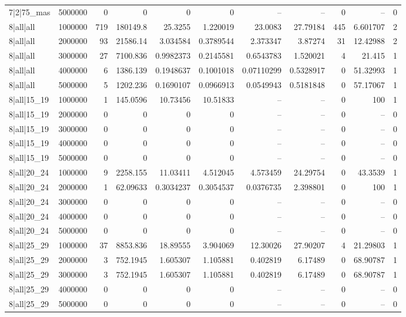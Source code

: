 \begin{tabular}{lrrrrrrrrrr}
7|2|75\_mas & 5000000 & 0 & 0 & 0 & 0 & -- & -- & 0 & -- & 0 \\
8|all|all & 1000000 & 719 & 180149.8 & 25.3255 & 1.220019 & 23.0083 & 27.79184 & 445 & 6.601707 & 2 \\
8|all|all & 2000000 & 93 & 21586.14 & 3.034584 & 0.3789544 & 2.373347 & 3.87274 & 31 & 12.42988 & 2 \\
8|all|all & 3000000 & 27 & 7100.836 & 0.9982373 & 0.2145581 & 0.6543783 & 1.520021 & 4 & 21.415 & 1 \\
8|all|all & 4000000 & 6 & 1386.139 & 0.1948637 & 0.1001018 & 0.07110299 & 0.5328917 & 0 & 51.32993 & 1 \\
8|all|all & 5000000 & 5 & 1202.236 & 0.1690107 & 0.0966913 & 0.0549943 & 0.5181848 & 0 & 57.17067 & 1 \\
8|all|15\_19 & 1000000 & 1 & 145.0596 & 10.73456 & 10.51833 & -- & -- & 0 & 100 & 1 \\
8|all|15\_19 & 2000000 & 0 & 0 & 0 & 0 & -- & -- & 0 & -- & 0 \\
8|all|15\_19 & 3000000 & 0 & 0 & 0 & 0 & -- & -- & 0 & -- & 0 \\
8|all|15\_19 & 4000000 & 0 & 0 & 0 & 0 & -- & -- & 0 & -- & 0 \\
8|all|15\_19 & 5000000 & 0 & 0 & 0 & 0 & -- & -- & 0 & -- & 0 \\
8|all|20\_24 & 1000000 & 9 & 2258.155 & 11.03411 & 4.512045 & 4.573459 & 24.29754 & 0 & 43.3539 & 1 \\
8|all|20\_24 & 2000000 & 1 & 62.09633 & 0.3034237 & 0.3054537 & 0.0376735 & 2.398801 & 0 & 100 & 1 \\
8|all|20\_24 & 3000000 & 0 & 0 & 0 & 0 & -- & -- & 0 & -- & 0 \\
8|all|20\_24 & 4000000 & 0 & 0 & 0 & 0 & -- & -- & 0 & -- & 0 \\
8|all|20\_24 & 5000000 & 0 & 0 & 0 & 0 & -- & -- & 0 & -- & 0 \\
8|all|25\_29 & 1000000 & 37 & 8853.836 & 18.89555 & 3.904069 & 12.30026 & 27.90207 & 4 & 21.29803 & 1 \\
8|all|25\_29 & 2000000 & 3 & 752.1945 & 1.605307 & 1.105881 & 0.402819 & 6.17489 & 0 & 68.90787 & 1 \\
8|all|25\_29 & 3000000 & 3 & 752.1945 & 1.605307 & 1.105881 & 0.402819 & 6.17489 & 0 & 68.90787 & 1 \\
8|all|25\_29 & 4000000 & 0 & 0 & 0 & 0 & -- & -- & 0 & -- & 0 \\
8|all|25\_29 & 5000000 & 0 & 0 & 0 & 0 & -- & -- & 0 & -- & 0 \\

\end{tabular}
